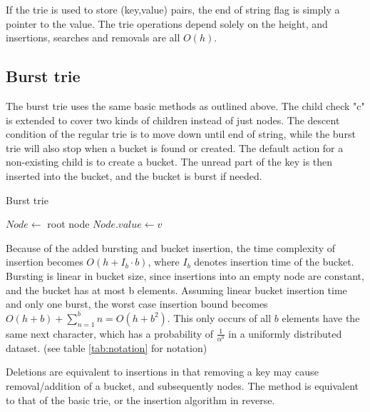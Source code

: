 If the trie is used to store (key,value) pairs, the end of string flag is
simply a pointer to the value. The trie operations depend solely on the height,
and insertions, searches and removals are all $O(h)$.

\subsection{Burst trie}
The burst trie uses the same basic methods as outlined above. The child check
"c" is extended to cover two kinds of children instead of just nodes. The
descent condition of the regular trie is to move down until end of string, while
the burst trie will also stop when a bucket is found or created.
The default action for a non-existing child is to create a bucket. The unread part
of the key is then inserted into the bucket, and the bucket is burst if needed.

\begin{algorithm}[H]
    \caption{Burst trie }
    \label{alg:bt_insert}


    $Node \leftarrow$  root node\;
    $Node.value \leftarrow v$\;
\end{algorithm}

Because of the added bursting and bucket insertion, the time complexity of
insertion becomes $O(h+I_b\cdot b)$, where $I_b$ denotes insertion time of the
bucket. Bursting is linear in bucket size, since insertions into an empty node
are constant, and the bucket has at most b elements.
Assuming linear bucket insertion time and only one burst, the worst case
insertion bound becomes $O(h+b) + \sum_{n=1}^b n  = O(h+b^2)$. This only occurs
of all $b$ elements have the same next character, which has a probability of
$\frac{1}{\alpha^b}$ in a uniformly distributed dataset.
(see table \ref{tab:notation} for notation)

Deletions are equivalent to insertions in that removing a key may cause
removal/addition of a bucket, and subsequently nodes. The method is equivalent
to that of the basic trie, or the insertion algorithm in reverse.

